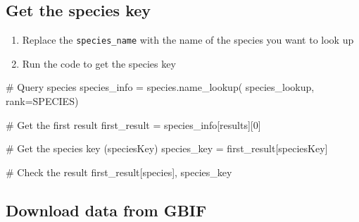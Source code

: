 \documentclass[
]{report}
\newenvironment{Shaded}{\begin{snugshade}}{\end{snugshade}}
\newcommand{\CommentTok}[1]{\textcolor[rgb]{0.37,0.37,0.37}{#1}}
\newcommand{\DecValTok}[1]{\textcolor[rgb]{0.68,0.00,0.00}{#1}}
\newcommand{\NormalTok}[1]{\textcolor[rgb]{0.00,0.23,0.31}{#1}}
\newcommand{\OperatorTok}[1]{\textcolor[rgb]{0.37,0.37,0.37}{#1}}
\newcommand{\StringTok}[1]{\textcolor[rgb]{0.13,0.47,0.30}{#1}}
\providecommand{\tightlist}{%
  \setlength{\itemsep}{0pt}\setlength{\parskip}{0pt}}
\begin{document}
\subsection{Get the species key}\label{get-the-species-key}

\begin{tcolorbox}[enhanced jigsaw, breakable, colframe=quarto-callout-color-frame, toptitle=1mm, bottomrule=.15mm, colbacktitle=quarto-callout-color!10!white, opacityback=0, opacitybacktitle=0.6, coltitle=black, title=\textcolor{quarto-callout-color}{\faInfo}\hspace{0.5em}{Try It}, left=2mm, bottomtitle=1mm, titlerule=0mm, arc=.35mm, colback=white, rightrule=.15mm, toprule=.15mm, leftrule=.75mm]

\begin{enumerate}
\def\labelenumi{\arabic{enumi}.}
\tightlist
\item
  Replace the \texttt{species\_name} with the name of the species you
  want to look up
\item
  Run the code to get the species key
\end{enumerate}

\end{tcolorbox}

\begin{Shaded}
\begin{Highlighting}[]
\CommentTok{\# Query species}
\NormalTok{species\_info }\OperatorTok{=}\NormalTok{ species.name\_lookup(}
\NormalTok{    species\_lookup, rank}\OperatorTok{=}\StringTok{\textquotesingle{}SPECIES\textquotesingle{}}\NormalTok{)}

\CommentTok{\# Get the first result}
\NormalTok{first\_result }\OperatorTok{=}\NormalTok{ species\_info[}\StringTok{\textquotesingle{}results\textquotesingle{}}\NormalTok{][}\DecValTok{0}\NormalTok{]}

\CommentTok{\# Get the species key (speciesKey)}
\NormalTok{species\_key }\OperatorTok{=}\NormalTok{ first\_result[}\StringTok{\textquotesingle{}speciesKey\textquotesingle{}}\NormalTok{]}

\CommentTok{\# Check the result}
\NormalTok{first\_result[}\StringTok{\textquotesingle{}species\textquotesingle{}}\NormalTok{], species\_key}
\end{Highlighting}
\end{Shaded}

\subsection{Download data from GBIF}\label{download-data-from-gbif}
\end{document}
